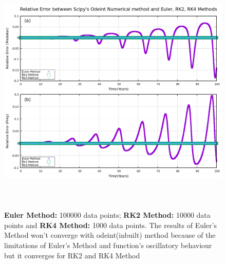 \documentclass[12pt]{article}
\begin{document}
\begin{figure}[h]
    \centering
    \includegraphics[width=15cm,height=12cm]{error_plot.png}
\caption{\textbf{Euler Method:} 100000 data points; \textbf{RK2 Method:} 10000 data points and \textbf{RK4 Method:} 1000 data points. The results of Euler's Method  won't converge with odeint(inbuilt) method because of the limitations of Euler's Method and function's oscillatory behaviour but it converges for RK2 and RK4 Method}
\end{figure}
\end{document}
